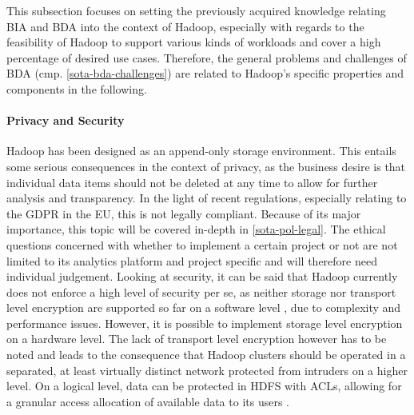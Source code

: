 This subsection focuses on setting the previously acquired knowledge relating \ac{BIA} and \ac{BDA} into the context of Hadoop, especially with regards to the feasibility of Hadoop to support various kinds of workloads and cover a high percentage of desired use cases. Therefore, the general problems and challenges of \ac{BDA} (cmp. \autoref{sota-bda-challenges}) are related to Hadoop's specific properties and components in the following.

\paragraph{Privacy and Security}
Hadoop has been designed as an append-only storage environment. This entails some serious consequences in the context of privacy, as the business desire is that individual data items should not be deleted at any time to allow for further analysis and transparency. In the light of recent regulations, especially relating to the \ac{GDPR} in the \ac{EU}, this is not legally compliant. Because of its major importance, this topic will be covered in-depth in \autoref{sota-pol-legal}. The ethical questions concerned with whether to implement a certain project or not are not limited to its analytics platform and project specific and will therefore need individual judgement. Looking at security, it can be said that Hadoop currently does not enforce a high level of security per se, as neither storage nor transport level encryption are supported so far on a software level \autocite[p.~82]{rajasekar2015survey}, due to complexity and performance issues. However, it is possible to implement storage level encryption on a hardware level. The lack of transport level encryption however has to be noted and leads to the consequence that Hadoop clusters should be operated in a separated, at least virtually distinct network protected from intruders on a higher level. On a logical level, data can be protected in \ac{HDFS} with \acp{ACL}, allowing for a granular access allocation of available data to its users \autocite{hdfspermissions}.

